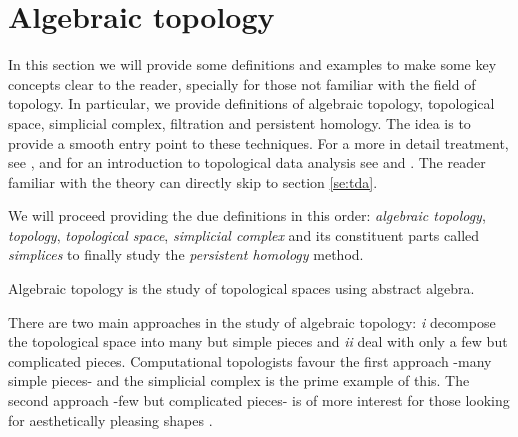 \documentclass[onecollarge,runningheads]{svjour2}
\begin{document}
\section{Algebraic topology}  %
\label{se:at}

In this section we will provide some definitions and examples to make some key concepts clear to the reader, specially for those not familiar with the field of topology. In particular, we provide definitions of algebraic topology, topological space, simplicial complex, filtration and persistent homology. The idea is to provide a smooth entry point to these techniques. For a more in detail treatment, see \cite{munkres1984elements}, \cite{hatcher2001} and for an introduction to topological data analysis see \cite{carlsson2009topology} and \cite{wasserman2016topological}. The reader familiar with the theory can directly skip to section \ref{se:tda}.

We will proceed providing the due definitions in this order: \emph{algebraic topology}, \emph{topology}, \emph{topological space}, \emph{simplicial complex} and its constituent parts called \emph{simplices} to finally study the \emph{persistent homology} method. 

\begin{definition}
Algebraic topology is the study of topological spaces using abstract algebra.
\end{definition}

There are two main approaches in the study of algebraic topology: \emph{i} decompose the topological space into many but simple pieces and \emph{ii} deal with only a few but complicated pieces. Computational topologists favour the first approach -many simple pieces- and the simplicial complex is the prime example of this. The second approach -few but complicated pieces- is of more interest for those looking for aesthetically pleasing shapes \cite{edelsbrunner2010computational}.
\end{document}
